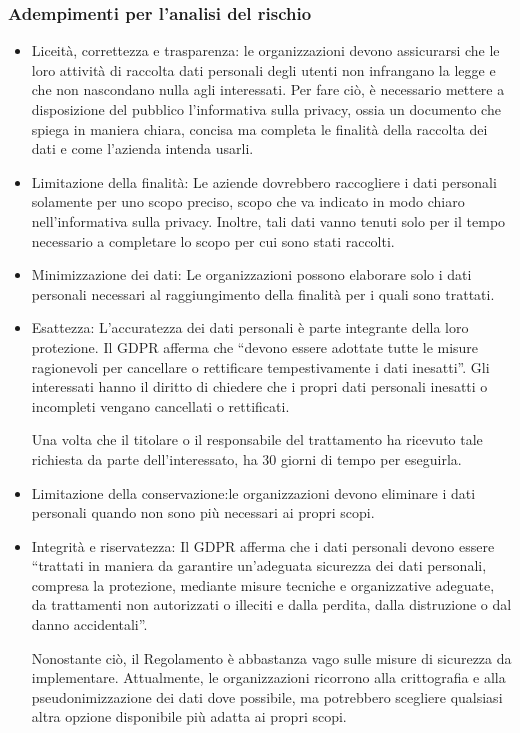 \subsubsection{Adempimenti per l’analisi del rischio}
\begin{itemize}
    \item Liceità, correttezza e trasparenza: le organizzazioni devono assicurarsi che le loro attività di raccolta dati personali degli utenti non infrangano la  legge e che non nascondano nulla agli interessati. Per fare ciò, è necessario mettere a disposizione del pubblico l’informativa sulla privacy, ossia un documento che spiega in maniera chiara, concisa ma completa le finalità della raccolta dei dati e come l’azienda intenda usarli. 
    \item Limitazione della finalità: Le aziende dovrebbero raccogliere i dati personali solamente per uno scopo preciso, scopo che va indicato in modo chiaro nell’informativa sulla privacy. Inoltre, tali dati vanno tenuti solo per il tempo necessario a completare lo scopo per cui sono stati raccolti.
    \item Minimizzazione dei dati: Le organizzazioni possono elaborare solo i dati personali necessari al raggiungimento della finalità per i quali sono trattati.
    \item Esattezza: L’accuratezza dei dati personali è parte integrante della loro protezione. Il GDPR afferma che “devono essere adottate tutte le misure ragionevoli per cancellare o rettificare tempestivamente i dati inesatti”. Gli interessati hanno il diritto di chiedere che i propri dati personali inesatti o incompleti vengano cancellati o rettificati.
    
    Una volta che il titolare o il responsabile del trattamento ha ricevuto tale richiesta da parte dell’interessato, ha 30 giorni di tempo per eseguirla.
    \item Limitazione della conservazione:le organizzazioni devono eliminare i dati personali quando non sono più necessari ai propri scopi.
    \item Integrità e riservatezza: Il GDPR afferma che i dati personali devono essere “trattati in maniera da garantire un’adeguata sicurezza dei dati personali, compresa la protezione, mediante misure tecniche e organizzative adeguate, da trattamenti non autorizzati o illeciti e dalla perdita, dalla distruzione o dal danno accidentali”.
    
    Nonostante ciò, il Regolamento è abbastanza vago sulle misure di sicurezza da implementare. Attualmente, le organizzazioni ricorrono alla crittografia e alla pseudonimizzazione dei dati dove possibile, ma potrebbero scegliere qualsiasi altra opzione disponibile più adatta ai propri scopi. 
    
\end{itemize}
